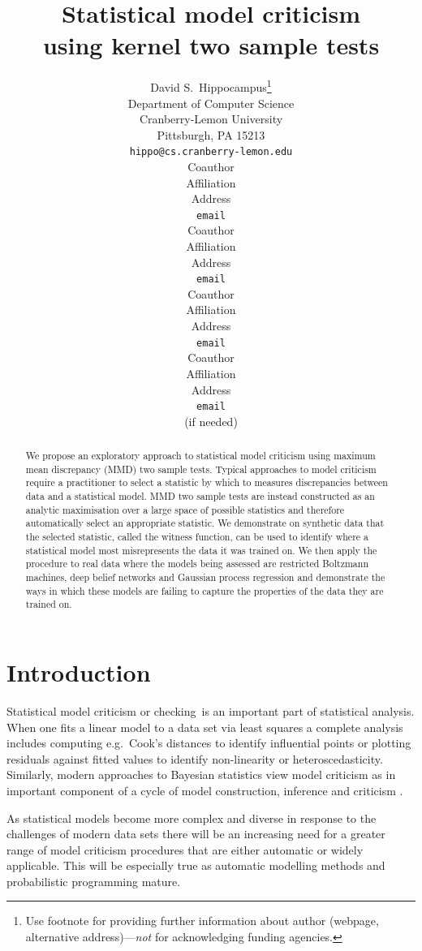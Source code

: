 \documentclass{article} %
\title{Statistical model criticism\\using kernel two sample tests}
\author{
David S.~Hippocampus\thanks{ Use footnote for providing further information
about author (webpage, alternative address)---\emph{not} for acknowledging
funding agencies.} \\
Department of Computer Science\\
Cranberry-Lemon University\\
Pittsburgh, PA 15213 \\
\texttt{hippo@cs.cranberry-lemon.edu} \\
\And
Coauthor \\
Affiliation \\
Address \\
\texttt{email} \\
\AND
Coauthor \\
Affiliation \\
Address \\
\texttt{email} \\
\And
Coauthor \\
Affiliation \\
Address \\
\texttt{email} \\
\And
Coauthor \\
Affiliation \\
Address \\
\texttt{email} \\
(if needed)\\
}
\def\eg{e.g.\ }
\begin{document}
 

\maketitle

\begin{abstract} 
We propose an exploratory approach to statistical model criticism using maximum mean discrepancy (MMD) two sample tests.
Typical approaches to model criticism require a practitioner to select a statistic by which to measures discrepancies between data and a statistical model.
MMD two sample tests are instead constructed as an analytic maximisation over a large space of possible statistics and therefore automatically select an appropriate statistic.
We demonstrate on synthetic data that the selected statistic, called the witness function, can be used to identify where a statistical model most misrepresents the data it was trained on.
We then apply the procedure to real data where the models being assessed are restricted Boltzmann machines, deep belief networks and Gaussian process regression and demonstrate the ways in which these models are failing to capture the properties of the data they are trained on.
\end{abstract} 

\allowdisplaybreaks

\section{Introduction}

Statistical model criticism or checking\footnotemark~is an important part of statistical analysis.
When one fits a linear model to a data set via least squares a complete analysis includes computing \eg Cook's distances \cite{Cook1982-eq} to identify influential points or plotting residuals against fitted values to identify non-linearity or heteroscedasticity.
Similarly, modern approaches to Bayesian statistics view model criticism as in important component of a cycle of model construction, inference and criticism \citep{Gelman2013-st}.

As statistical models become more complex and diverse in response to the challenges of modern data sets there will be an increasing need for a greater range of model criticism procedures that are either automatic or widely applicable.
This will be especially true as automatic modelling methods \citep[e.g.][]{Grosse2012-zf, Thornton2013-zg, Lloyd2014-ABCD} and probabilistic programming \citep[e.g.][]{Koller1997-am, Milch2007-dz, Goodman2012-pf, stan-software:2014} mature.
\end{document}
